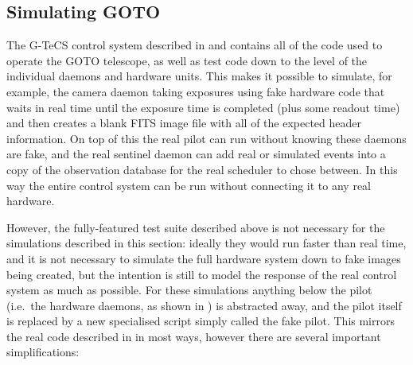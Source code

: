 \subsection{Simulating GOTO}
\label{sec:goto_sims}
\begin{colsection}

The G-TeCS control system described in  and  contains all of the code used to operate the GOTO telescope, as well as test code down to the level of the individual daemons and hardware units. This makes it possible to simulate, for example, the camera daemon taking exposures using fake hardware code that waits in real time until the exposure time is completed (plus some readout time) and then creates a blank FITS image file with all of the expected header information. On top of this the real pilot can run without knowing these daemons are fake, and the real sentinel daemon can add real or simulated events into a copy of the observation database for the real scheduler to chose between. In this way the entire control system can be run without connecting it to any real hardware.

However, the fully-featured test suite described above is not necessary for the simulations described in this section: ideally they would run faster than real time, and it is not necessary to simulate the full hardware system down to fake images being created, but the intention is still to model the response of the real control system as much as possible. For these simulations anything below the pilot (i.e.\ the hardware daemons, as shown in ) is abstracted away, and the pilot itself is replaced by a new specialised script simply called the fake pilot. This mirrors the real code described in  in most ways, however there are several important simplifications:


\end{colsection}
